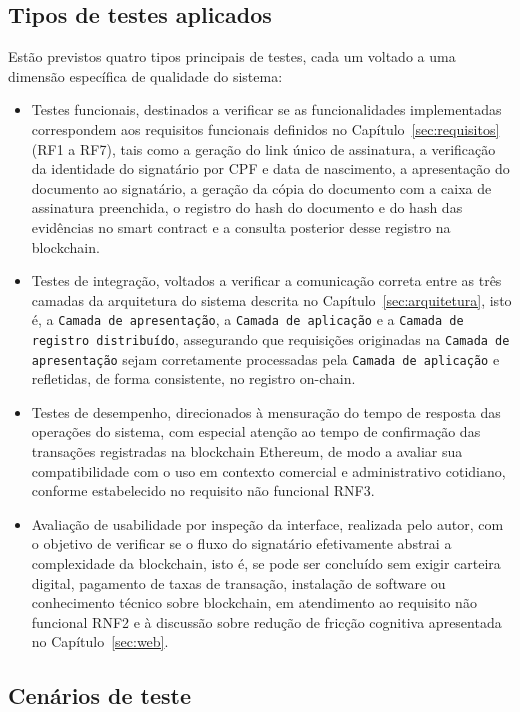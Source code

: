 \documentclass[
    12pt,
    a4paper,
    oneside,
    chapter=TITLE,
    section=TITLE,
    subsection=TITLE,
    subsubsection=TITLE,
    sumario=tradicional,
    english,
    brazil
]{abntex2}
\newcommand{\elem}[1]{\texttt{#1}}
\begin{document}
\subsection{Tipos de testes aplicados}

Estão previstos quatro tipos principais de testes, cada um voltado a uma dimensão específica de qualidade do sistema:
\begin{itemize}
\item Testes funcionais, destinados a verificar se as funcionalidades implementadas correspondem aos requisitos funcionais definidos no Capítulo~\ref{sec:requisitos} (RF1 a RF7), tais como a geração do link único de assinatura, a verificação da identidade do signatário por CPF e data de nascimento, a apresentação do documento ao signatário, a geração da cópia do documento com a caixa de assinatura preenchida, o registro do hash do documento e do hash das evidências no smart contract e a consulta posterior desse registro na blockchain.

\item Testes de integração, voltados a verificar a comunicação correta entre as três camadas da arquitetura do sistema descrita no Capítulo~\ref{sec:arquitetura}, isto é, a \elem{Camada de apresentação}, a \elem{Camada de aplicação} e a \elem{Camada de registro distribuído}, assegurando que requisições originadas na \elem{Camada de apresentação} sejam corretamente processadas pela \elem{Camada de aplicação} e refletidas, de forma consistente, no registro on-chain.

\item Testes de desempenho, direcionados à mensuração do tempo de resposta das operações do sistema, com especial atenção ao tempo de confirmação das transações registradas na blockchain Ethereum, de modo a avaliar sua compatibilidade com o uso em contexto comercial e administrativo cotidiano, conforme estabelecido no requisito não funcional RNF3.

\item Avaliação de usabilidade por inspeção da interface, realizada pelo autor, com o objetivo de verificar se o fluxo do signatário efetivamente abstrai a complexidade da blockchain, isto é, se pode ser concluído sem exigir carteira digital, pagamento de taxas de transação, instalação de software ou conhecimento técnico sobre blockchain, em atendimento ao requisito não funcional RNF2 e à discussão sobre redução de fricção cognitiva apresentada no Capítulo~\ref{sec:web}.
\end{itemize}
\subsection{Cenários de teste}
\label{sec:cenarios-teste}
\end{document}
